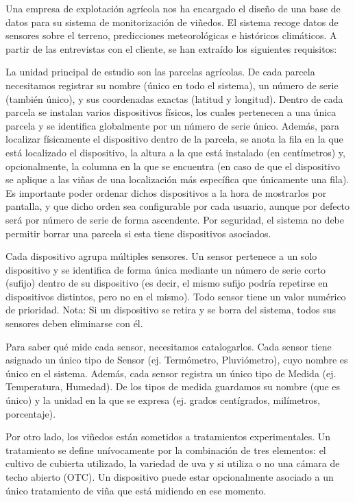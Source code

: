 \documentclass{db-practice}
\begin{document}
Una empresa de explotación agrícola nos ha encargado el diseño de una base de
datos para su sistema de monitorización de viñedos. El sistema recoge datos de
sensores sobre el terreno, predicciones meteorológicas e históricos climáticos.
A partir de las entrevistas con el cliente, se han extraído los siguientes
requisitos:

La unidad principal de estudio son las parcelas agrícolas. De cada parcela
necesitamos registrar su nombre (único en todo el sistema), un número de serie
(también único), y sus coordenadas exactas (latitud y longitud). Dentro de cada
parcela se instalan varios dispositivos físicos, los cuales pertenecen a una
única parcela y se identifica globalmente por un número de serie único. Además,
para localizar físicamente el dispositivo dentro de la parcela, se anota la fila
en la que está localizado el dispositivo, la altura a la que está instalado (en
centímetros) y, opcionalmente, la columna en la que se encuentra (en caso de que
el dispositivo se aplique a las viñas de una localización más específica que
únicamente una fila). Es importante poder ordenar dichos dispositivos a la hora
de mostrarlos por pantalla, y que dicho orden sea configurable por cada usuario,
aunque por defecto será por número de serie de forma ascendente. Por seguridad,
el sistema no debe permitir borrar una parcela si esta tiene dispositivos
asociados.

Cada dispositivo agrupa múltiples sensores. Un sensor pertenece a un solo
dispositivo y se identifica de forma única mediante un número de serie corto
(sufijo) dentro de su dispositivo (es decir, el mismo sufijo podría repetirse en
dispositivos distintos, pero no en el mismo). Todo sensor tiene un valor numérico
de prioridad. Nota: Si un dispositivo se retira y se borra del sistema, todos sus
sensores deben eliminarse con él.

Para saber qué mide cada sensor, necesitamos catalogarlos. Cada sensor tiene
asignado un único tipo de Sensor (ej. Termómetro, Pluviómetro), cuyo nombre es
único en el sistema. Además, cada sensor registra un único tipo de Medida (ej.
Temperatura, Humedad). De los tipos de medida guardamos su nombre (que es único)
y la unidad en la que se expresa (ej. grados centígrados, milímetros,
porcentaje).

Por otro lado, los viñedos están sometidos a tratamientos experimentales. Un
tratamiento se define unívocamente por la combinación de tres elementos: el
cultivo de cubierta utilizado, la variedad de uva y si utiliza o no una cámara
de techo abierto (OTC). Un dispositivo puede estar opcionalmente asociado a un
único tratamiento de viña que está midiendo en ese momento.
\end{document}
